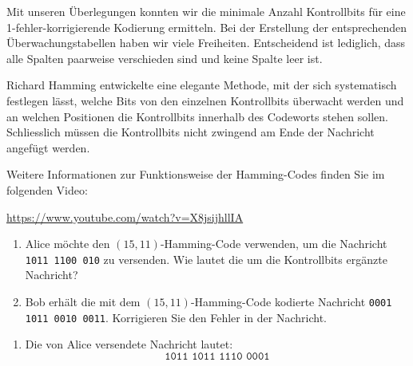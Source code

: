 \begin{myexercise}
	Mit unseren Überlegungen konnten wir die minimale Anzahl
	Kontrollbits für eine 1-fehler-korrigierende Kodierung ermitteln.
	Bei der Erstellung der entsprechenden Überwachungstabellen
	haben wir viele Freiheiten. Entscheidend ist lediglich, dass
	alle Spalten paarweise verschieden sind und keine Spalte leer ist.

	Richard Hamming entwickelte eine elegante Methode, mit der
	sich systematisch festlegen lässt, welche Bits von den einzelnen
	Kontrollbits überwacht werden und an welchen Positionen die
	Kontrollbits innerhalb des Codeworts stehen sollen. Schliesslich
	müssen die Kontrollbits nicht zwingend am Ende der Nachricht
	angefügt werden.

	Weitere Informationen zur Funktionsweise der Hamming-Codes
	finden Sie im folgenden Video:

	\begin{center}
		\url{https://www.youtube.com/watch?v=X8jsijhllIA}
	\end{center}



	\begin{enumerate}
		\item Alice möchte den \((15,11)\)-Hamming-Code verwenden,
		      um die Nachricht \texttt{1011 1100 010} zu versenden.
		      Wie lautet die um die Kontrollbits ergänzte Nachricht?

		\item Bob erhält die mit dem \((15,11)\)-Hamming-Code
		      kodierte Nachricht \texttt{0001 1011 0010 0011}.
		      Korrigieren Sie den Fehler in der Nachricht.
	\end{enumerate}

	\begin{myanswer}

		\begin{enumerate}
			\item Die von Alice versendete Nachricht lautet:
			      \[
				      \texttt{1011 1011 1110 0001}
			      \]

			      \begin{center}
\end{center}
\end{enumerate}
\end{myanswer}
\end{myexercise}
